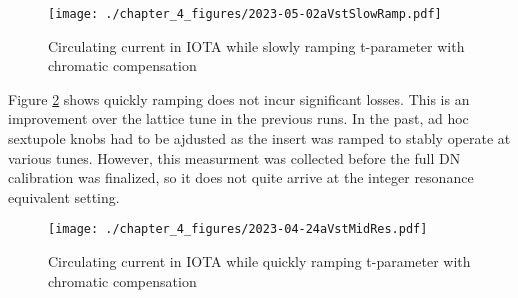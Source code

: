 \begin{figure}
	\centering
	\texttt{[image: ./chapter\_4\_figures/2023-05-02aVstSlowRamp.pdf]}
	\caption{Circulating current in IOTA while slowly ramping t-parameter with chromatic compensation}
	\label{fig:slowRamp}
\end{figure}

Figure \ref{fig:fastRamp} shows quickly ramping does not incur significant losses. This is an improvement over the lattice tune in the previous runs. In the past, ad hoc sextupole knobs had to be ajdusted as the insert was ramped to stably operate at various tunes. However, this measurment was collected before the full DN calibration was finalized, so it does not quite arrive at the integer resonance equivalent setting.

\begin{figure}
	\centering
	\texttt{[image: ./chapter\_4\_figures/2023-04-24aVstMidRes.pdf]}
	\caption{Circulating current in IOTA while quickly ramping t-parameter with chromatic compensation}
	\label{fig:fastRamp}
\end{figure}


